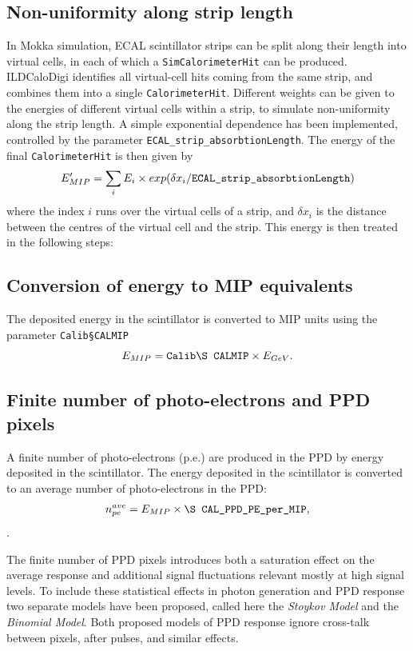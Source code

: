 \documentclass[12pt]{article} %
\begin{document}
\subsection*{Non-uniformity along strip length}
In Mokka simulation, ECAL scintillator strips can be split along their length into virtual cells, 
in each of which a {\tt SimCalorimeterHit} can be produced. 
ILDCaloDigi identifies all virtual-cell hits coming from the same strip, and combines them into a single {\tt CalorimeterHit}.
Different weights can be given to the energies of different virtual cells within a strip, to simulate non-uniformity
along the strip length. A simple exponential dependence has been implemented, controlled by the parameter
{\tt ECAL\_strip\_absorbtionLength}. The energy of the final {\tt CalorimeterHit} is then given by
\begin{equation*}
E'_{MIP} = \sum_{i} E_{i} \times exp( \delta x_i / \text{\tt ECAL\_strip\_absorbtionLength} )
\end{equation*}
where the index $i$ runs over the virtual cells of a strip, and $\delta x_i$ is the distance between the 
centres of the virtual cell and the strip. This energy is then treated in the following steps:

\subsection*{Conversion of energy to MIP equivalents}
The deposited energy in the scintillator is converted to MIP units using the parameter {\tt Calib\S CALMIP}
\begin{equation*}
E_{MIP} = \text{\tt Calib\S CALMIP} \times E_{GeV} .
\end{equation*}

\subsection*{Finite number of photo-electrons and PPD pixels}
A finite number of photo-electrons (p.e.) are produced in the PPD by energy deposited in the scintillator.
The energy deposited in the scintillator is converted to an average number of photo-electrons in the PPD:
\begin{equation*}
n_{pe}^{ave} = E_{MIP} \times \text{\tt \S CAL\_PPD\_PE\_per\_MIP},
\end{equation*}.

The finite number of PPD pixels introduces both a saturation effect on the average response and additional signal fluctuations relevant mostly at high signal levels. 
To include these statistical effects in photon generation and PPD response two separate models have been proposed, called here the \emph{Stoykov Model} and the \emph{Binomial Model}. Both proposed models of PPD response ignore cross-talk between pixels, after pulses, and similar effects.
\end{document}
